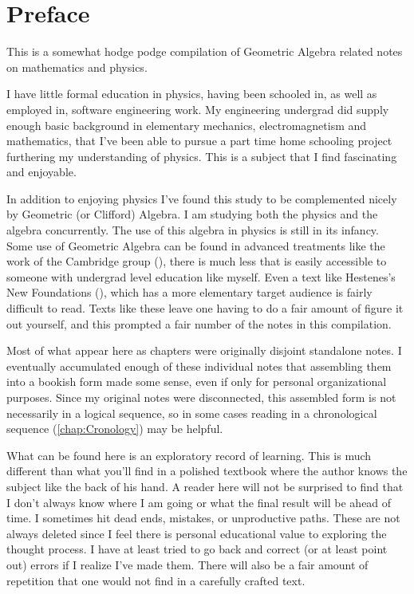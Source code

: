 \chapter*{Preface}\normalsize

This is a somewhat hodge podge compilation of Geometric Algebra related notes on mathematics and physics.

I have little formal education in physics, having been schooled in, as well as employed in, software engineering work.  My engineering undergrad did supply enough basic background in elementary mechanics, electromagnetism and mathematics, that I've been able to pursue a part time home schooling project furthering my understanding of physics.  This is a subject that I find fascinating and enjoyable.

In addition to enjoying physics I've found this study to be complemented nicely by Geometric (or Clifford) Algebra.  I am studying both the physics and the algebra concurrently.  The use of this algebra in physics is still in its infancy.  Some use of Geometric Algebra can be found in advanced treatments like the work of the Cambridge group (\cite{doran2003gap}), there is much less that is easily accessible to someone with undergrad level education like myself.  Even a text like Hestenes's New Foundations (\cite{hestenes1999nfc}), which has a more elementary target audience is fairly difficult to read.  Texts like these leave one having to do a fair amount of figure it out yourself, and this prompted a fair number of the notes in this compilation.

Most of what appear here as chapters were originally disjoint standalone notes.  I eventually accumulated enough of these individual notes that assembling them into a bookish form made some sense, even if only for personal organizational purposes.  Since my original notes were disconnected, this assembled form is not necessarily in a logical sequence, so in some cases reading in a chronological sequence (\ref{chap:Cronology}) may be helpful.

What can be found here is an exploratory record of learning.  This is much different than what you'll find in a polished textbook where the author knows the subject like the back of his hand.  A reader here will not be surprised to find that I don't always know where I am going or what the final result will be ahead of time.  I sometimes hit dead ends, mistakes, or unproductive paths.  These are not always deleted since I feel there is personal educational value to exploring the thought process.  I have at least tried to go back and correct (or at least point out) errors if I realize I've made them.  There will also be a fair amount of repetition that one would not find in a carefully crafted text.

